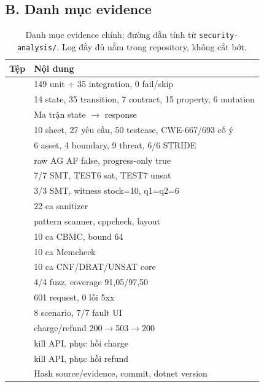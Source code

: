 \documentclass[12pt,a4paper]{article}
\begin{document}
\subsection*{B. Danh mục evidence}
\begin{table}[H]
\centering
\footnotesize
\renewcommand{\arraystretch}{1.2}
\begin{tabularx}{\textwidth}{@{}L{5.0cm} Y@{}}
\toprule
\textbf{Tệp} & \textbf{Nội dung} \\
\midrule
{} & 149 unit + 35 integration, 0 fail/skip \\
 & 14 state, 35 transition, 7 contract, 15 property, 6 mutation \\
 & Ma trận state $\rightarrow$ response \\
 & 10 sheet, 27 yêu cầu, 50 testcase, CWE-667/693 cố ý \\
 & 6 asset, 4 boundary, 9 threat, 6/6 STRIDE \\
 & raw AG AF false, progress-only true \\
 & 7/7 SMT, TEST6 sat, TEST7 unsat \\
 & 3/3 SMT, witness stock=10, q1=q2=6 \\
 & 22 ca sanitizer \\
 & pattern scanner, cppcheck, layout \\
 & 10 ca CBMC, bound 64 \\
 & 10 ca Memcheck \\
 & 10 ca CNF/DRAT/UNSAT core \\
 & 4/4 fuzz, coverage 91,05/97,50 \\
 & 601 request, 0 lỗi 5xx \\
 & 8 scenario, 7/7 fault UI \\
 & charge/refund 200$\rightarrow$503$\rightarrow$200 \\
 & kill API, phục hồi charge \\
 & kill API, phục hồi refund \\
 & Hash source/evidence, commit, dotnet version \\
\bottomrule
\end{tabularx}
\caption{Danh mục evidence chính; đường dẫn tính từ \texttt{security-analysis/}. Log đầy đủ nằm trong repository, không cắt bớt.}
\end{table}
\end{document}
